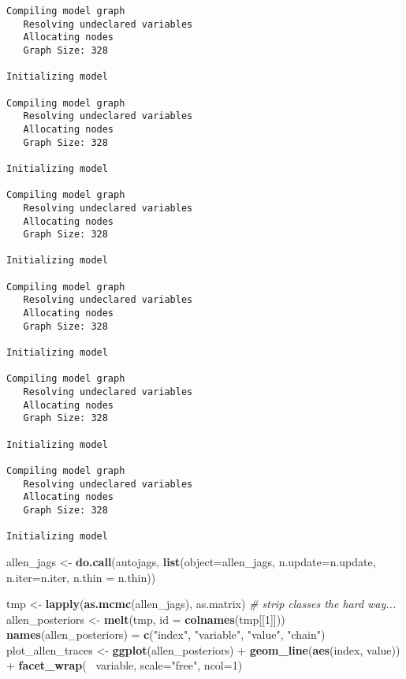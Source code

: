 \documentclass[author-year, review]{elsarticle} %
\newenvironment{Shaded}{}{}
\newcommand{\KeywordTok}[1]{\textcolor[rgb]{0.00,0.44,0.13}{\textbf{{#1}}}}
\newcommand{\DataTypeTok}[1]{\textcolor[rgb]{0.56,0.13,0.00}{{#1}}}
\newcommand{\DecValTok}[1]{\textcolor[rgb]{0.25,0.63,0.44}{{#1}}}
\newcommand{\StringTok}[1]{\textcolor[rgb]{0.25,0.44,0.63}{{#1}}}
\newcommand{\CommentTok}[1]{\textcolor[rgb]{0.38,0.63,0.69}{\textit{{#1}}}}
\newcommand{\NormalTok}[1]{{#1}}
\begin{document}
\begin{verbatim}
Compiling model graph
   Resolving undeclared variables
   Allocating nodes
   Graph Size: 328

Initializing model

Compiling model graph
   Resolving undeclared variables
   Allocating nodes
   Graph Size: 328

Initializing model

Compiling model graph
   Resolving undeclared variables
   Allocating nodes
   Graph Size: 328

Initializing model

Compiling model graph
   Resolving undeclared variables
   Allocating nodes
   Graph Size: 328

Initializing model

Compiling model graph
   Resolving undeclared variables
   Allocating nodes
   Graph Size: 328

Initializing model

Compiling model graph
   Resolving undeclared variables
   Allocating nodes
   Graph Size: 328

Initializing model
\end{verbatim}

\begin{Shaded}
\begin{Highlighting}[]
\NormalTok{allen_jags <- }\KeywordTok{do.call}\NormalTok{(autojags, }
                                            \KeywordTok{list}\NormalTok{(}\DataTypeTok{object=}\NormalTok{allen_jags, }\DataTypeTok{n.update=}\NormalTok{n.update, }
                           \DataTypeTok{n.iter=}\NormalTok{n.iter, }\DataTypeTok{n.thin =} \NormalTok{n.thin))}
\end{Highlighting}
\end{Shaded}

\begin{Shaded}
\begin{Highlighting}[]
\NormalTok{tmp <- }\KeywordTok{lapply}\NormalTok{(}\KeywordTok{as.mcmc}\NormalTok{(allen_jags), as.matrix) }\CommentTok{# strip classes the hard way...}
\NormalTok{allen_posteriors <- }\KeywordTok{melt}\NormalTok{(tmp, }\DataTypeTok{id =} \KeywordTok{colnames}\NormalTok{(tmp[[}\DecValTok{1}\NormalTok{]])) }
\KeywordTok{names}\NormalTok{(allen_posteriors) = }\KeywordTok{c}\NormalTok{(}\StringTok{"index"}\NormalTok{, }\StringTok{"variable"}\NormalTok{, }\StringTok{"value"}\NormalTok{, }\StringTok{"chain"}\NormalTok{)}
\NormalTok{plot_allen_traces <- }\KeywordTok{ggplot}\NormalTok{(allen_posteriors) + }\KeywordTok{geom_line}\NormalTok{(}\KeywordTok{aes}\NormalTok{(index, value)) + }
  \KeywordTok{facet_wrap}\NormalTok{(~ variable, }\DataTypeTok{scale=}\StringTok{"free"}\NormalTok{, }\DataTypeTok{ncol=}\DecValTok{1}\NormalTok{)}
\end{Highlighting}
\end{Shaded}
\end{document}
